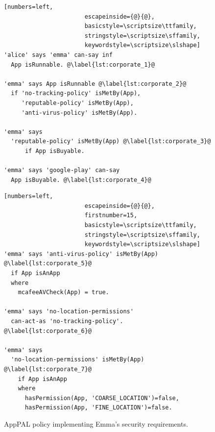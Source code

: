\documentclass[]{llncs}
\begin{document}
\begin{figure}
  \begin{minipage}[t]{0.5\textwidth}
    \begin{lstlisting}[numbers=left,
                       escapeinside={@}{@},
                       basicstyle=\scriptsize\ttfamily,
                       stringstyle=\scriptsize\sffamily,
                       keywordstyle=\scriptsize\slshape]
'alice' says 'emma' can-say inf
  App isRunnable. @\label{lst:corporate_1}@

'emma' says App isRunnable @\label{lst:corporate_2}@
  if 'no-tracking-policy' isMetBy(App),
     'reputable-policy' isMetBy(App),
     'anti-virus-policy' isMetBy(App).

'emma' says
  'reputable-policy' isMetBy(App) @\label{lst:corporate_3}@
      if App isBuyable.

'emma' says 'google-play' can-say
  App isBuyable. @\label{lst:corporate_4}@
    \end{lstlisting}
  \end{minipage}\begin{minipage}[t]{0.5\textwidth}
    \begin{lstlisting}[numbers=left,
                       escapeinside={@}{@},
                       firstnumber=15,
                       basicstyle=\scriptsize\ttfamily,
                       stringstyle=\scriptsize\sffamily,
                       keywordstyle=\scriptsize\slshape]
'emma' says 'anti-virus-policy' isMetBy(App) @\label{lst:corporate_5}@
  if App isAnApp
  where
    mcafeeAVCheck(App) = true.

'emma' says 'no-location-permissions'
  can-act-as 'no-tracking-policy'. @\label{lst:corporate_6}@

'emma' says
  'no-location-permissions' isMetBy(App) @\label{lst:corporate_7}@
    if App isAnApp
    where
      hasPermission(App, 'COARSE_LOCATION')=false,
      hasPermission(App, 'FINE_LOCATION')=false.
\end{lstlisting}
\end{minipage}
\caption{AppPAL policy implementing Emma's security requirements.}
\label{lst:corporate}
\end{figure}
\end{document}
